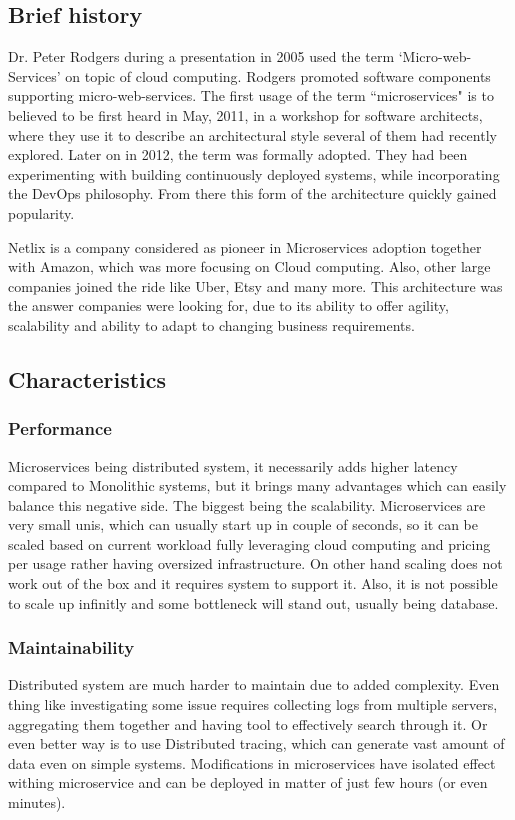 \subsection{Brief history}
Dr. Peter Rodgers during a presentation in 2005 used the term `Micro-web-Services' on topic of cloud computing. Rodgers promoted software components supporting micro-web-services. The first usage of the term ``microservices" is to believed to be first heard in May, 2011, in a workshop for software architects, where they use it to describe an architectural style several of them had recently explored. Later on in 2012, the term was formally adopted. They had been experimenting with building continuously deployed systems, while incorporating the DevOps philosophy. From there this form of the architecture quickly gained popularity. \cite{BRIEF_HISTORY_OF_MS}

Netlix is a company considered as pioneer in Microservices adoption together with Amazon, which was more focusing on Cloud computing. Also, other large companies joined the ride like Uber, Etsy and many more. This architecture was the answer companies were looking for, due to its ability to offer agility, scalability and ability to adapt to changing business requirements. \cite{MS_COMPANIES}



\subsection{Characteristics}
\subsubsection{Performance}
\label{section:microservices:performance}
Microservices being distributed system, it necessarily adds higher latency compared to Monolithic systems, but it brings many advantages which can easily balance this negative side. The biggest being the scalability. Microservices are very small unis, which can usually start up in couple of seconds, so it can be scaled based on current workload fully leveraging cloud computing and pricing per usage rather having oversized infrastructure. On other hand scaling does not work out of the box and it requires system to support it. Also, it is not possible to scale up infinitly and some bottleneck will stand out, usually being database.


\subsubsection{Maintainability}
Distributed system are much harder to maintain due to added complexity. Even thing like investigating some issue requires collecting logs from multiple servers, aggregating them together and having tool to effectively search through it. Or even better way is to use Distributed tracing, which can generate vast amount of data even on simple systems. Modifications in microservices have isolated effect withing microservice and can be deployed in matter of just few hours (or even minutes).

